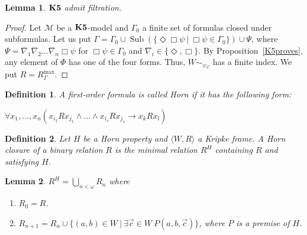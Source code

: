 \documentclass[a4paper]{article}
\theoremstyle{defin}
\newtheorem{defin}{Definition}
\theoremstyle{theorem}
\theoremstyle{prop}
\theoremstyle{lemma}
\newtheorem{lemma}{Lemma}
\theoremstyle{fact}
\theoremstyle{ex}
\theoremstyle{col}
\begin{document}
\begin{lemma}
  ${\bf K5}$ admit filtration.
\end{lemma}

\begin{proof}
  Let $\mathcal{M}$ be a ${\bf K5}$-model and $\Gamma_0$ a finite set of formulas closed under subformulas.
  Let us put $\Gamma = \Gamma_0 \cup \operatorname{Sub}(\{ \Diamond \Box \psi \: | \: \Box \psi \in \Gamma_0 \}) \cup \Psi$, where $\Psi = \nabla_1 \nabla_2 \dots \nabla_n \Box \psi$ for $\Box \psi \in \Gamma_0$ and
  $\nabla_i \in \{ \Diamond, \Box \}$. By Proposition~\ref{K5proves}, any element of $\Phi$ has one of the four forms. Thus, $W \sim_{\equiv_{\Gamma}}$ has a finite index.
  We put $\widehat{R} = R^{\operatorname{max}}_{\Gamma}$.
\end{proof}

\begin{defin} A first-order formula is called Horn if it has the following form:

  \begin{center}
    $\forall x_1, \dots, x_n (x_{i_1} R x_{j_1} \land \dots \land x_{i_s} R x_{j_s} \rightarrow x_k R x_l)$
  \end{center}
\end{defin}

\begin{defin}
  Let $H$ be a Horn property and $\langle W, R \rangle$ a Kripke frame. A Horn closure of a binary relation $R$ is the minimal relation $R^{H}$ containing $R$ and satisfying $H$.
\end{defin}

\begin{lemma}
  $R^{H} = \bigcup \limits_{n < \omega} R_n$ where

  \begin{enumerate}
    \item $R_0 = R$.
    \item $R_{n + 1} = R_n \cup \{ (a, b) \in W \: | \: \exists \vec{c} \in W \: P(a, b, \vec{c})\}$, where $P$ is a premise of $H$.
  \end{enumerate}
\end{lemma}
\end{document}

